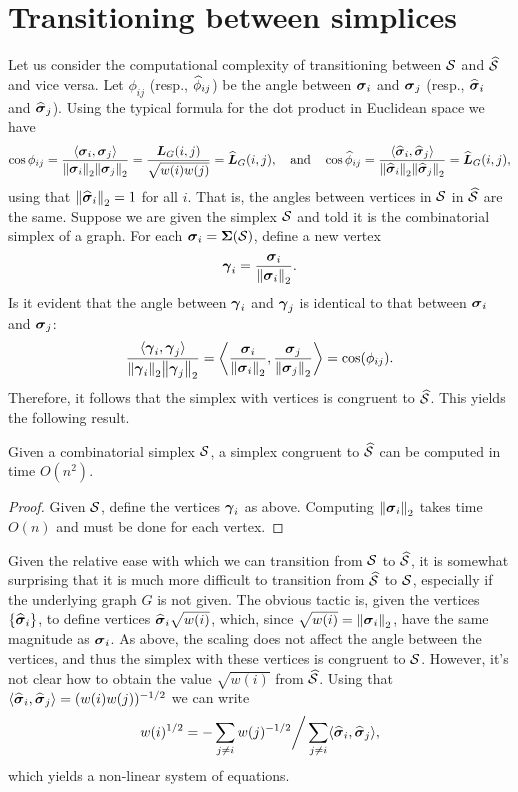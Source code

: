 \section{Transitioning between simplices}
Let us consider the computational complexity of transitioning between $\mathcal{S}$ and $\widehat{\mathcal{S}}$ and vice versa. Let $\phi_{ij}$ (resp., $\widehat{\phi}_{ij}$) be the angle between $\vb*{\sigma}_i$ and $\vb*{\sigma}_j$ (resp., $\widehat{\vb*{\sigma}}_i$ and $\widehat{\vb*{\sigma}}_j$). Using the typical formula for the dot product in Euclidean space we have
\begin{equation*}
\cos\phi_{ij} = \frac{\langle \vb*{\sigma}_i,\vb*{\sigma}_j\rangle }{\norm{\vb*{\sigma}_i}_2\norm{\vb*{\sigma}_j}_2} = \frac{\vb*{L}_G(i,j)}{\sqrt{w(i)w(j)}} = \widehat{\vb*{L}}_G(i,j), \quad\text{and}\quad \cos\widehat{\phi}_{ij} = \frac{\langle \widehat{\vb*{\sigma}}_i,\widehat{\vb*{\sigma}}_j\rangle }{\norm{\widehat{\vb*{\sigma}}_i}_2\norm{\widehat{\vb*{\sigma}}_j}_2} = \widehat{\vb*{L}}_G(i,j),
\end{equation*}
using that $\norm{\widehat{\vb*{\sigma}}_i}_2=1$ for all $i$. 
That is, the angles between vertices in $\mathcal{S}$ in $\widehat{\mathcal{S}}$ are the same. Suppose we are given the simplex $\mathcal{S}$ and told it is the combinatorial simplex of a graph. For each $\vb*{\sigma}_i = \boldsymbol{\Sigma}(\mathcal{S})$, define a new vertex 
\[\vb*{\gamma}_i = \frac{\vb*{\sigma}_i}{\norm{\vb*{\sigma}_i}_2}.\]
Is it evident that the angle between $\vb*{\gamma}_i$ and $\vb*{\gamma}_j$ is identical to that between $\vb*{\sigma}_i$ and $\vb*{\sigma}_j$: 
\begin{equation*}
\frac{\langle \vb*{\gamma}_i,\vb*{\gamma}_j\rangle}{\norm{\vb*{\gamma}_i}_2\norm{\vb*{\gamma}_j}_2} = \bigg\langle \frac{\vb*{\sigma}_i}{\norm{\vb*{\sigma}_i}_2},\frac{\vb*{\sigma}_j}{\norm{\vb*{\sigma}_j}_2}\bigg\rangle = \cos(\phi_{ij}).
\end{equation*}
Therefore, it follows that the simplex with vertices is congruent  to $\widehat{\mathcal{S}}$. This yields the following result. 

\begin{lemma}
	Given a combinatorial simplex $\mathcal{S}$, a simplex congruent to $\widehat{\mathcal{S}}$ can be computed in time $O(n^2)$. 
\end{lemma}
\begin{proof}
	Given $\mathcal{S}$, define the vertices $\vb*{\gamma}_i$ as above. Computing $\norm{\vb*{\sigma}_i}_2$ takes time $O(n)$ and must be done for each vertex. 
\end{proof}

Given the relative ease with which we can transition from $\mathcal{S}$ to $\widehat{\mathcal{S}}$, it is somewhat surprising that it is much more difficult to transition from $\widehat{\mathcal{S}}$ to  $\mathcal{S}$, especially if the underlying graph $G$ is not given. The obvious tactic is, given the vertices $\{\widehat{\vb*{\sigma}}_i\}$, to define vertices $\widehat{\vb*{\sigma}}_i \sqrt{w(i)}$, which, since $\sqrt{w(i)}=\norm{\vb*{\sigma}_i}_2$, have the same magnitude as $\vb*{\sigma}_i$. As above, the scaling does not affect the angle between the vertices, and thus the simplex with these vertices is congruent to $\mathcal{S}$. However, it's not clear how to obtain the value $\sqrt{w(i)}$ from $\widehat{\mathcal{S}}$. Using that $\langle \widehat{\vb*{\sigma}}_i,\widehat{\vb*{\sigma}}_j\rangle =(w(i)w(j))^{-1/2}$ we can write 
\[w(i)^{1/2} = -\sum_{j\neq i}w(j)^{-1/2} \bigg/ \sum_{j\neq i}\langle \widehat{\vb*{\sigma}}_i,\widehat{\vb*{\sigma}}_j\rangle,\]
which yields a non-linear system of equations. 




